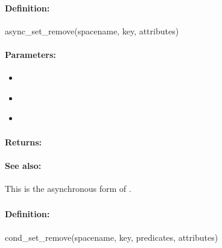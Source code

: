 \paragraph{Definition:}
\begin{rubycode}
async_set_remove(spacename, key, attributes)
\end{rubycode}

\paragraph{Parameters:}
\begin{itemize}[noitemsep]
\item {}\\

\item {}\\

\item {}\\

\end{itemize}

\paragraph{Returns:}


\paragraph{See also:}  This is the asynchronous form of .

\pagebreak
\subsubsection{}
\label{api:ruby:cond_set_remove}


\paragraph{Definition:}
\begin{rubycode}
cond_set_remove(spacename, key, predicates, attributes)
\end{rubycode}

